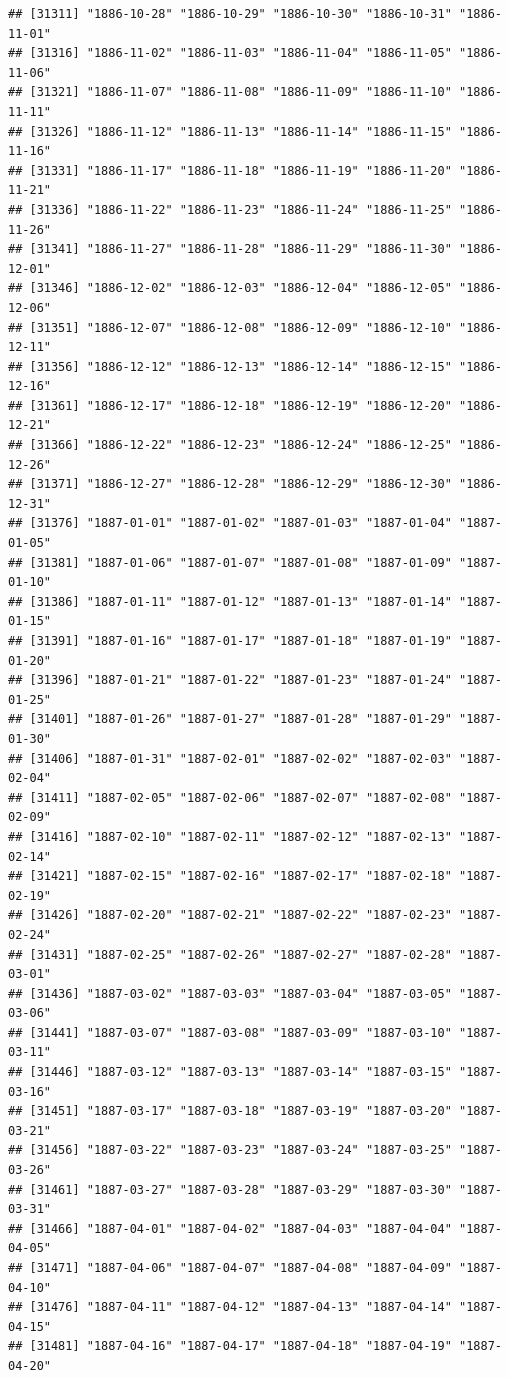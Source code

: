 \documentclass{article}\usepackage[]{graphicx}\usepackage[]{color}
\makeatletter
\newenvironment{kframe}{%
 \def\at@end@of@kframe{}%
 \ifinner\ifhmode%
  \def\at@end@of@kframe{\end{minipage}}%
  \begin{minipage}{\columnwidth}%
 \fi\fi%
 \def\FrameCommand##1{\hskip\@totalleftmargin \hskip-\fboxsep
 \colorbox{shadecolor}{##1}\hskip-\fboxsep
     \hskip-\linewidth \hskip-\@totalleftmargin \hskip\columnwidth}%
 \MakeFramed {\advance\hsize-\width
   \@totalleftmargin\z@ \linewidth\hsize
   \@setminipage}}%
 {\par\unskip\endMakeFramed%
 \at@end@of@kframe}
\newenvironment{knitrout}{}{} %
\makeatother
\begin{document}
\begin{description}
\begin{knitrout}
\begin{kframe}
\begin{verbatim}
## [31311] "1886-10-28" "1886-10-29" "1886-10-30" "1886-10-31" "1886-11-01"
## [31316] "1886-11-02" "1886-11-03" "1886-11-04" "1886-11-05" "1886-11-06"
## [31321] "1886-11-07" "1886-11-08" "1886-11-09" "1886-11-10" "1886-11-11"
## [31326] "1886-11-12" "1886-11-13" "1886-11-14" "1886-11-15" "1886-11-16"
## [31331] "1886-11-17" "1886-11-18" "1886-11-19" "1886-11-20" "1886-11-21"
## [31336] "1886-11-22" "1886-11-23" "1886-11-24" "1886-11-25" "1886-11-26"
## [31341] "1886-11-27" "1886-11-28" "1886-11-29" "1886-11-30" "1886-12-01"
## [31346] "1886-12-02" "1886-12-03" "1886-12-04" "1886-12-05" "1886-12-06"
## [31351] "1886-12-07" "1886-12-08" "1886-12-09" "1886-12-10" "1886-12-11"
## [31356] "1886-12-12" "1886-12-13" "1886-12-14" "1886-12-15" "1886-12-16"
## [31361] "1886-12-17" "1886-12-18" "1886-12-19" "1886-12-20" "1886-12-21"
## [31366] "1886-12-22" "1886-12-23" "1886-12-24" "1886-12-25" "1886-12-26"
## [31371] "1886-12-27" "1886-12-28" "1886-12-29" "1886-12-30" "1886-12-31"
## [31376] "1887-01-01" "1887-01-02" "1887-01-03" "1887-01-04" "1887-01-05"
## [31381] "1887-01-06" "1887-01-07" "1887-01-08" "1887-01-09" "1887-01-10"
## [31386] "1887-01-11" "1887-01-12" "1887-01-13" "1887-01-14" "1887-01-15"
## [31391] "1887-01-16" "1887-01-17" "1887-01-18" "1887-01-19" "1887-01-20"
## [31396] "1887-01-21" "1887-01-22" "1887-01-23" "1887-01-24" "1887-01-25"
## [31401] "1887-01-26" "1887-01-27" "1887-01-28" "1887-01-29" "1887-01-30"
## [31406] "1887-01-31" "1887-02-01" "1887-02-02" "1887-02-03" "1887-02-04"
## [31411] "1887-02-05" "1887-02-06" "1887-02-07" "1887-02-08" "1887-02-09"
## [31416] "1887-02-10" "1887-02-11" "1887-02-12" "1887-02-13" "1887-02-14"
## [31421] "1887-02-15" "1887-02-16" "1887-02-17" "1887-02-18" "1887-02-19"
## [31426] "1887-02-20" "1887-02-21" "1887-02-22" "1887-02-23" "1887-02-24"
## [31431] "1887-02-25" "1887-02-26" "1887-02-27" "1887-02-28" "1887-03-01"
## [31436] "1887-03-02" "1887-03-03" "1887-03-04" "1887-03-05" "1887-03-06"
## [31441] "1887-03-07" "1887-03-08" "1887-03-09" "1887-03-10" "1887-03-11"
## [31446] "1887-03-12" "1887-03-13" "1887-03-14" "1887-03-15" "1887-03-16"
## [31451] "1887-03-17" "1887-03-18" "1887-03-19" "1887-03-20" "1887-03-21"
## [31456] "1887-03-22" "1887-03-23" "1887-03-24" "1887-03-25" "1887-03-26"
## [31461] "1887-03-27" "1887-03-28" "1887-03-29" "1887-03-30" "1887-03-31"
## [31466] "1887-04-01" "1887-04-02" "1887-04-03" "1887-04-04" "1887-04-05"
## [31471] "1887-04-06" "1887-04-07" "1887-04-08" "1887-04-09" "1887-04-10"
## [31476] "1887-04-11" "1887-04-12" "1887-04-13" "1887-04-14" "1887-04-15"
## [31481] "1887-04-16" "1887-04-17" "1887-04-18" "1887-04-19" "1887-04-20"

\end{verbatim}
\end{kframe}
\end{knitrout}
\end{description}
\end{document}
